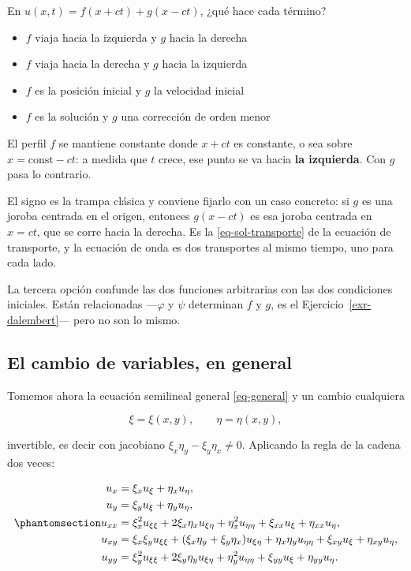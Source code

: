 \documentclass[
  spanish,
  a4paper,
]{scrbook}
\providecommand{\tightlist}{%
  \setlength{\itemsep}{0pt}\setlength{\parskip}{0pt}}
\theoremstyle{definition}
\theoremstyle{plain}
\theoremstyle{definition}
\theoremstyle{plain}
\theoremstyle{definition}
\theoremstyle{remark}
\begin{document}
En \(u(x,t) = f(x+ct) + g(x-ct)\), ¿qué hace cada término?

\begin{itemize}
\tightlist
\item
  {\(f\) viaja hacia la izquierda y \(g\) hacia la derecha}
\item
  {\(f\) viaja hacia la derecha y \(g\) hacia la izquierda}
\item
  {\(f\) es la posición inicial y \(g\) la velocidad inicial}
\item
  {\(f\) es la solución y \(g\) una corrección de orden menor}
\end{itemize}

El perfil \(f\) se mantiene constante donde \(x+ct\) es constante, o sea
sobre \(x = \text{const} - ct\): a medida que \(t\) crece, ese punto se
va hacia \textbf{la izquierda}. Con \(g\) pasa lo contrario.

El signo es la trampa clásica y conviene fijarlo con un caso concreto:
si \(g\) es una joroba centrada en el origen, entonces \(g(x-ct)\) es
esa joroba centrada en \(x=ct\), que se corre hacia la derecha. Es la
\ref{eq-sol-transporte} de la ecuación de transporte, y la ecuación de
onda es dos transportes al mismo tiempo, uno para cada lado.

La tercera opción confunde las dos funciones arbitrarias con las dos
condiciones iniciales. Están relacionadas ---\(\varphi\) y \(\psi\)
determinan \(f\) y \(g\), es el Ejercicio~\ref{exr-dalembert}--- pero no
son lo mismo.

\subsection{El cambio de variables, en
general}\label{sec-cambio-general}

Tomemos ahora la ecuación semilineal general \ref{eq-general} y un
cambio cualquiera

\[
\xi = \xi(x,y), \qquad \eta = \eta(x,y),
\]

invertible, es decir con jacobiano \(\xi_x\eta_y - \xi_y\eta_x \neq 0\).
Aplicando la regla de la cadena dos veces:

\begin{equation}\protect\phantomsection\label{eq-cadena-segundo}{
\begin{aligned}
u_x &= \xi_x u_\xi + \eta_x u_\eta, \\
u_y &= \xi_y u_\xi + \eta_y u_\eta, \\
u_{xx} &= \xi_x^2 u_{\xi\xi} + 2\xi_x\eta_x u_{\xi\eta} + \eta_x^2 u_{\eta\eta}
        + \xi_{xx} u_\xi + \eta_{xx} u_\eta, \\
u_{xy} &= \xi_x\xi_y u_{\xi\xi} + (\xi_x\eta_y + \xi_y\eta_x) u_{\xi\eta} + \eta_x\eta_y u_{\eta\eta}
        + \xi_{xy} u_\xi + \eta_{xy} u_\eta, \\
u_{yy} &= \xi_y^2 u_{\xi\xi} + 2\xi_y\eta_y u_{\xi\eta} + \eta_y^2 u_{\eta\eta}
        + \xi_{yy} u_\xi + \eta_{yy} u_\eta .
\end{aligned}
}\end{equation}
\end{document}
